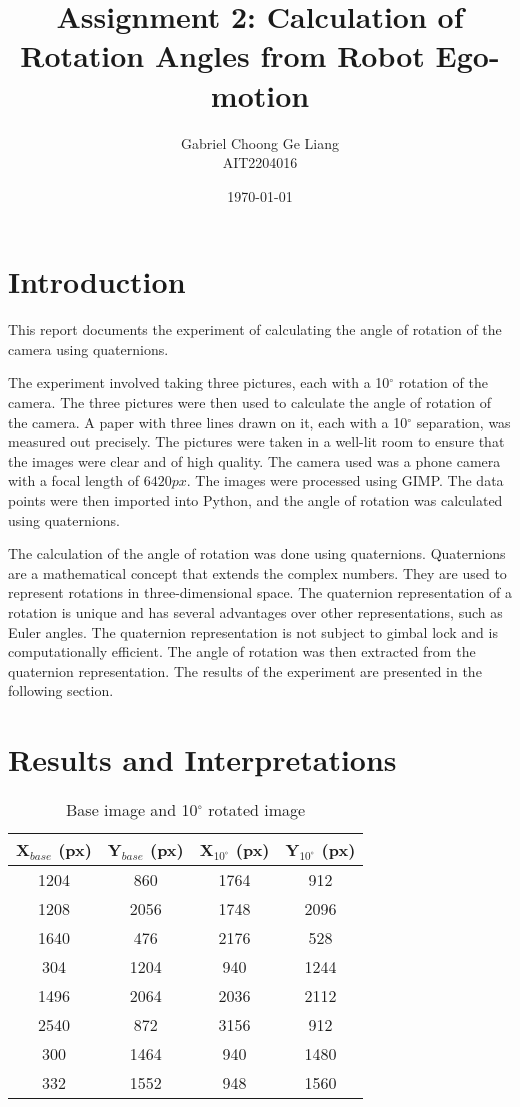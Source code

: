 \documentclass{article}
\title{Assignment 2: Calculation of Rotation Angles from Robot Ego-motion}
\author{
  Gabriel Choong Ge Liang \\
  AIT2204016 \\
  }
\date{\today}
\begin{document}
\maketitle

\section{Introduction}
This report documents the experiment of calculating the angle of rotation of the camera using quaternions.

The experiment involved taking three pictures, each with a 10$^{\circ}$ rotation of the camera. The three pictures were then used to calculate the angle of rotation of the camera. A paper with three lines drawn on it, each with a 10$^{\circ}$ separation, was measured out precisely. The pictures were taken in a well-lit room to ensure that the images were clear and of high quality. The camera used was a phone camera with a focal length of $6420px$. The images were processed using GIMP. The data points were then imported into Python, and the angle of rotation was calculated using quaternions.

The calculation of the angle of rotation was done using quaternions. Quaternions are a mathematical concept that extends the complex numbers. They are used to represent rotations in three-dimensional space. The quaternion representation of a rotation is unique and has several advantages over other representations, such as Euler angles. The quaternion representation is not subject to gimbal lock and is computationally efficient. The angle of rotation was then extracted from the quaternion representation. The results of the experiment are presented in the following section.

\section{Results and Interpretations}
\begin{table}[h]
\centering
  \begin{tabular}{|c|c|c|c|}
  \hline

  X$_{base}$ (px) & Y$_{base}$ (px) & X$_{10^{\circ}}$ (px) & Y$_{10^{\circ}}$ (px)\\ \hline
  1204 & 860 & 1764 & 912 \\ \hline
  1208 & 2056 & 1748 & 2096 \\ \hline
  1640 & 476 & 2176 & 528 \\ \hline
  304 & 1204 & 940 & 1244 \\ \hline
  1496 & 2064 & 2036 & 2112 \\ \hline
  2540 & 872 & 3156 & 912 \\ \hline
  300 & 1464 & 940 & 1480 \\ \hline
  332 & 1552 & 948 & 1560 \\ \hline
  \end{tabular}
\caption{Base image and 10$^{\circ}$ rotated image}
\label{tab:distances}
\end{table}
\end{document}
